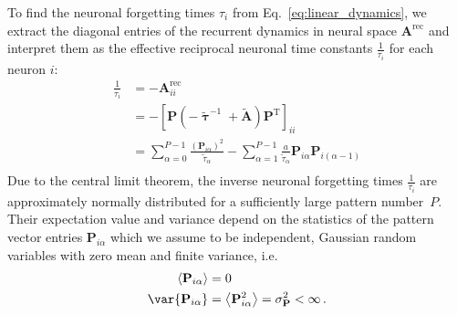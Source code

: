 To find the neuronal forgetting times $\tau_i$ from Eq.~\ref{eq:linear_dynamics}, we extract the diagonal entries of the recurrent dynamics in neural space $\mathbf{A}^{\text{rec}}$ and interpret them as the effective reciprocal neuronal time constants $\frac{1}{\tau_i}$ for each neuron $i$:
%
\begin{equation}
  \begin{aligned}
    \frac{1}{\tau_i} &= - \mathbf{A}^{\text{rec}}_{ii} \\
    &= - \left[ \mathbf{P} (- \tilde{\boldsymbol{\uptau}}^{-1} + \tilde{\mathbf{A}}) \mathbf{P}^{\mathrm{T}} \right]_{ii} \\
    &= \sum_{\alpha=0}^{P-1} \frac{(\mathbf{P}_{i \alpha})^2}{\tilde{\tau}_\alpha} - \sum_{\alpha=1}^{P-1} \frac{a}{\tilde{\tau}_\alpha} \mathbf{P}_{i \alpha} \mathbf{P}_{i (\alpha -1)} \\
  \end{aligned}
  \label{eq:neuronal_inv_tau}
\end{equation}
%
%
%
Due to the central limit theorem, the inverse neuronal forgetting times $\frac{1}{\tau_i}$ are approximately normally distributed for a sufficiently large pattern number~$P$. Their expectation value and variance depend on the statistics of the pattern vector entries $\mathbf{P}_{i\alpha}$ which we assume to be independent, Gaussian random variables with zero mean and finite variance, i.e.
%
\begin{equation}
  \begin{aligned}
    \left<\mathbf{P}_{i\alpha}\right> &= 0 \\
    \var{\mathbf{P}_{i\alpha}} &= \left<\mathbf{P}_{i\alpha}^2\right> = \sigma_{\mathbf{P}}^2 < \infty \,.
    \label{eq:pattern_stats}
  \end{aligned}
\end{equation}
